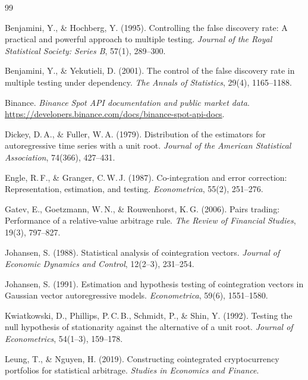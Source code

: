 \documentclass[10pt,a4paper,twocolumn]{article}
\begin{document}
	\begingroup
	\scriptsize\raggedright\sloppy
	\setlength{\itemsep}{0pt}\setlength{\parskip}{0pt}\setlength{\parsep}{0pt}\setlength{\labelsep}{0.3em}
	\begin{thebibliography}{99}
		
		 Benjamini, Y., \& Hochberg, Y. (1995). Controlling the false discovery rate: A practical and powerful approach to multiple testing. \emph{Journal of the Royal Statistical Society: Series B}, 57(1), 289--300.
		
		 Benjamini, Y., \& Yekutieli, D. (2001). The control of the false discovery rate in multiple testing under dependency. \emph{The Annals of Statistics}, 29(4), 1165--1188.
		
		 Binance. \emph{Binance Spot API documentation and public market data}. \url{https://developers.binance.com/docs/binance-spot-api-docs}.
		
		 Dickey, D.\,A., \& Fuller, W.\,A. (1979). Distribution of the estimators for autoregressive time series with a unit root. \emph{Journal of the American Statistical Association}, 74(366), 427--431.
		
		 Engle, R.\,F., \& Granger, C.\,W.\,J. (1987). Co-integration and error correction: Representation, estimation, and testing. \emph{Econometrica}, 55(2), 251--276.
		
		 Gatev, E., Goetzmann, W.\,N., \& Rouwenhorst, K.\,G. (2006). Pairs trading: Performance of a relative-value arbitrage rule. \emph{The Review of Financial Studies}, 19(3), 797--827.
		
		 Johansen, S. (1988). Statistical analysis of cointegration vectors. \emph{Journal of Economic Dynamics and Control}, 12(2--3), 231--254.
		
		 Johansen, S. (1991). Estimation and hypothesis testing of cointegration vectors in Gaussian vector autoregressive models. \emph{Econometrica}, 59(6), 1551--1580.
		
		 Kwiatkowski, D., Phillips, P.\,C.\,B., Schmidt, P., \& Shin, Y. (1992). Testing the null hypothesis of stationarity against the alternative of a unit root. \emph{Journal of Econometrics}, 54(1--3), 159--178.
		
		 Leung, T., \& Nguyen, H. (2019). Constructing cointegrated cryptocurrency portfolios for statistical arbitrage. \emph{Studies in Economics and Finance}.
		

\end{thebibliography}
\end{document}
